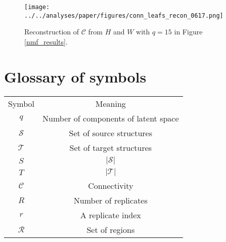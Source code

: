 \begin{figure}[H]
    \centering
    \texttt{[image: ../../analyses/paper/figures/conn\_leafs\_recon\_0617.png]} 
    \label{fig:distances}
    \caption{Reconstruction of $\mathcal C$ from $H$ and $W$ with $q=15$ in Figure \ref{nmf_results}.}
\end{figure}


\newpage

\section{Glossary of symbols}

\begin{table}
\begin{tabular}{c|c}
Symbol & Meaning \\
$q$ & Number of components of latent space \\
$\mathcal S$ & Set of source structures \\
$\mathcal T$ & Set of target structures \\
$S$ & $|\mathcal S|$ \\ 
$T$ & $|\mathcal T|$ \\ 
$\mathcal C$ & Connectivity \\
$R$ & Number of replicates \\
$r$ & A replicate index \\
$\mathcal R$ & Set of regions
\end{tabular}
\end{table}









